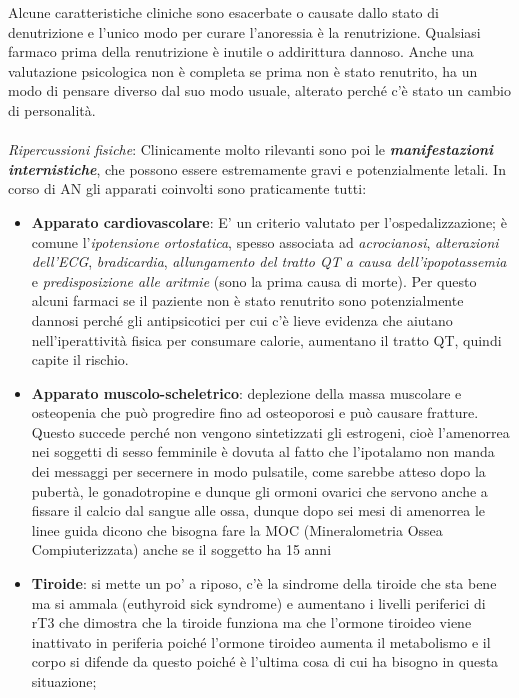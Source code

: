 Alcune caratteristiche cliniche sono esacerbate o causate dallo stato di
denutrizione e l'unico modo per curare l'anoressia è la renutrizione.
Qualsiasi farmaco prima della renutrizione è inutile o addirittura
dannoso. Anche una valutazione psicologica non è completa se prima non è
stato renutrito, ha un modo di pensare diverso dal suo modo usuale,
alterato perché c'è stato un cambio di personalità.
\\\\
\emph{\emph{Ripercussioni fisiche}}: Clinicamente molto rilevanti sono
poi le \textbf{\emph{manifestazioni internistiche}}, che possono essere
estremamente gravi e potenzialmente letali. In corso di AN gli apparati
coinvolti sono praticamente tutti:

\begin{itemize}
\item
  \textbf{Apparato cardiovascolare}: E' un criterio valutato per
  l'ospedalizzazione; è comune l'\emph{ipotensione ortostatica}, spesso
  associata ad \emph{acrocianosi}, \emph{alterazioni dell'ECG},
  \emph{bradicardia}, \emph{allungamento del tratto QT a causa
  dell'ipopotassemia} e \emph{predisposizione alle aritmie} (sono la
  prima causa di morte). Per questo alcuni farmaci se il paziente non è
  stato renutrito sono potenzialmente dannosi perché gli antipsicotici
  per cui c'è lieve evidenza che aiutano nell'iperattività fisica per
  consumare calorie, aumentano il tratto QT, quindi capite il rischio.
\item
  \textbf{Apparato muscolo-scheletrico}: deplezione della massa
  muscolare e osteopenia che può progredire fino ad osteoporosi e può
  causare fratture. Questo succede perché non vengono sintetizzati gli
  estrogeni, cioè l'amenorrea nei soggetti di sesso femminile è dovuta
  al fatto che l'ipotalamo non manda dei messaggi per secernere in modo
  pulsatile, come sarebbe atteso dopo la pubertà, le gonadotropine e
  dunque gli ormoni ovarici che servono anche a fissare il calcio dal
  sangue alle ossa, dunque dopo sei mesi di amenorrea le linee guida
  dicono che bisogna fare la MOC (Mineralometria Ossea Compiuterizzata)
  anche se il soggetto ha 15 anni
\item
  \textbf{Tiroide}: si mette un po' a riposo, c'è la sindrome della
  tiroide che sta bene ma si ammala (euthyroid sick syndrome) e
  aumentano i livelli periferici di rT3 che dimostra che la tiroide
  funziona ma che l'ormone tiroideo viene inattivato in periferia poiché
  l'ormone tiroideo aumenta il metabolismo e il corpo si difende da
  questo poiché è l'ultima cosa di cui ha bisogno in questa situazione;

\end{itemize}
